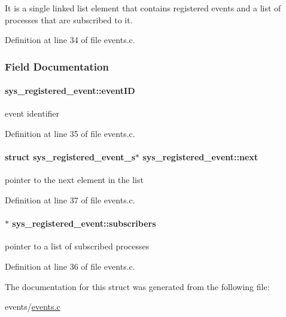 It is a single linked list element that contains registered events and a list of processes that are subscribed to it. 

Definition at line 34 of file events.\+c.



\subsubsection{Field Documentation}
\hypertarget{structsys__registered__event_a2a51dcccee68f255abf32bc3feb584f4}{}
\paragraph[{event\+I\+D}]{ sys\+\_\+registered\+\_\+event\+::event\+I\+D}\label{structsys__registered__event_a2a51dcccee68f255abf32bc3feb584f4}
event identifier 

Definition at line 35 of file events.\+c.

\hypertarget{structsys__registered__event_acbd46e5730440d227197def0c9e51a79}{}
\paragraph[{next}]{\setlength{\rightskip}{0pt plus 5cm}struct sys\+\_\+registered\+\_\+event\+\_\+s$\ast$ sys\+\_\+registered\+\_\+event\+::next}\label{structsys__registered__event_acbd46e5730440d227197def0c9e51a79}
pointer to the next element in the list 

Definition at line 37 of file events.\+c.

\hypertarget{structsys__registered__event_a05b146034143e4b7998e265c41e8dea6}{}
\paragraph[{subscribers}]{$\ast$ sys\+\_\+registered\+\_\+event\+::subscribers}\label{structsys__registered__event_a05b146034143e4b7998e265c41e8dea6}
pointer to a list of subscribed processes 

Definition at line 36 of file events.\+c.



The documentation for this struct was generated from the following file\+:\begin{DoxyCompactItemize}
\item 
events/\hyperlink{events_8c}{events.\+c}\end{DoxyCompactItemize}
